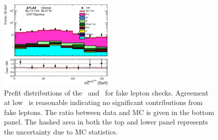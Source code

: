 \begin{figure}[htbp]
\begin{center}
\includegraphics[width=0.49\textwidth]{figures/ttGamma/MtMetLep_CRTTGamma_withRatio_log.eps}
\caption{\label{fig:ttVFakeLepCheck} Prefit distributions of the \met\ and \mtlepmet\ for fake lepton checks. Agreement at low \mtlepmet\ is reasonable indicating no significant contributions from fake leptons. The ratio between data and MC is given in the bottom panel. The hashed area in both the top and lower panel represents the uncertainty due to MC statistics.}
\label{fig:ttgamma}
\end{center}
\end{figure}





